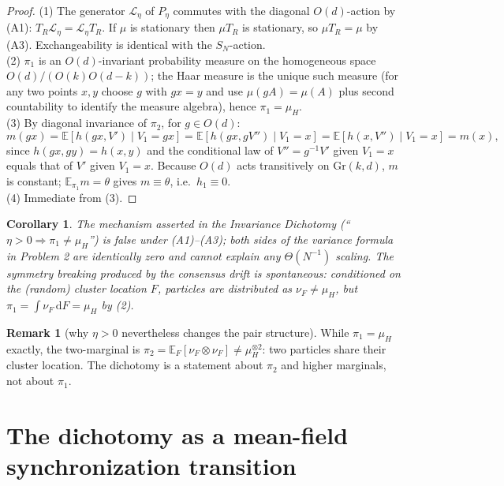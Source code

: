 \documentclass[11pt]{article}
\newtheorem{corollary}[theorem]{Corollary}
\theoremstyle{definition}
\newtheorem{remark}[theorem]{Remark}
\newcommand{\Gr}{\mathrm{Gr}}
\newcommand{\E}{\mathbb{E}}
\newcommand{\dd}{\mathrm{d}}
\begin{document}
\begin{proof}
(1) The generator $\mathcal L_\eta$ of $P_\eta$ commutes with the diagonal
$O(d)$-action by (A1): $T_R\mathcal L_\eta=\mathcal L_\eta T_R$. If $\mu$ is stationary
then $\mu T_R$ is stationary, so $\mu T_R=\mu$ by (A3). Exchangeability is identical
with the $S_N$-action.\\
(2) $\pi_1$ is an $O(d)$-invariant probability measure on the homogeneous space
$O(d)/(O(k)O(d-k))$; the Haar measure is the unique such measure (for any two points
$x,y$ choose $g$ with $gx=y$ and use $\mu(gA)=\mu(A)$ plus second countability to
identify the measure algebra), hence $\pi_1=\mu_H$.\\
(3) By diagonal invariance of $\pi_2$, for $g\in O(d)$:
\[
m(gx)=\E[h(gx,V')\mid V_1=gx]
=\E[h(gx,gV'')\mid V_1=x]=\E[h(x,V'')\mid V_1=x]=m(x),
\]
since $h(gx,gy)=h(x,y)$ and the conditional law of $V''=g^{-1}V'$ given $V_1=x$
equals that of $V'$ given $V_1=x$. Because $O(d)$ acts transitively on $\Gr(k,d)$,
$m$ is constant; $\E_{\pi_1} m=\theta$ gives $m\equiv\theta$, i.e.\ $h_1\equiv0$.\\
(4) Immediate from (3).
\end{proof}

\begin{corollary}
The mechanism asserted in the Invariance Dichotomy (``$\eta>0\Rightarrow\pi_1\ne\mu_H$'')
is false under (A1)--(A3); both sides of the variance formula in Problem 2
are identically zero and cannot explain any $\Theta(N^{-1})$ scaling.
The symmetry breaking produced by the consensus drift is \emph{spontaneous}:
conditioned on the (random) cluster location $F$, particles are distributed as
$\nu_F\ne\mu_H$, but $\pi_1=\int\nu_F\,\dd F=\mu_H$ by (2).
\end{corollary}

\begin{remark}[why $\eta>0$ nevertheless changes the pair structure]
While $\pi_1=\mu_H$ exactly, the two-marginal is
$\pi_2=\E_F[\nu_F\otimes\nu_F]\ne\mu_H^{\otimes2}$: two particles share their cluster
location. The dichotomy is a statement about $\pi_2$ and higher marginals, not about
$\pi_1$.
\end{remark}

\section{The dichotomy as a mean-field synchronization transition}
\end{document}
